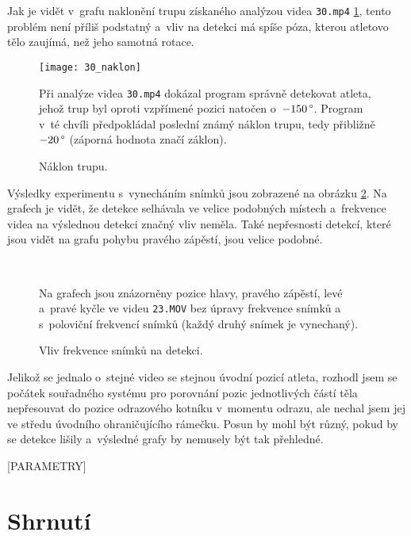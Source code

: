 Jak je vidět v~grafu naklonění trupu získaného analýzou videa \texttt{30.mp4} \ref{fig:30_naklon}, tento problém není příliš podstatný a~vliv na detekci má spíše póza, kterou atletovo tělo zaujímá, než jeho samotná rotace.

\begin{figure}[h]\centering
    \texttt{[image: 30\_naklon]}
    \caption{Náklon trupu.}
    \small
    Při analýze videa \texttt{30.mp4} dokázal program správně detekovat atleta, jehož trup byl oproti vzpřímené pozici natočen o~$-150\,\rm \degree$. Program v~té chvíli předpokládal poslední známý náklon trupu, tedy přibližně $-20\,\rm \degree$ (záporná hodnota značí záklon).
    \label{fig:30_naklon}
\end{figure}

Výsledky experimentu s~vynecháním snímků jsou zobrazené na obrázku \ref{fig:fps}. Na grafech je vidět, že detekce selhávala ve velice podobných místech a~frekvence videa na výslednou detekci značný vliv neměla. Také nepřesnosti detekcí, které jsou vidět na grafu pohybu pravého zápěstí, jsou velice podobné.

\begin{figure}[h]\centering
     \\
    \caption{Vliv frekvence snímků na detekci.}
    \small
    Na grafech jsou znázorněny pozice hlavy, pravého zápěstí, levé a~pravé kyčle ve videu \texttt{23.MOV} bez úpravy frekvence snímků a s~poloviční frekvencí snímků (každý druhý snímek je vynechaný).
    \label{fig:fps}
\end{figure}

Jelikož se jednalo o~stejné video se stejnou úvodní pozicí atleta, rozhodl jsem se počátek souřadného systému pro porovnání pozic jednotlivých částí těla nepřesouvat do pozice odrazového kotníku v~momentu odrazu, ale nechal jsem jej ve středu úvodního ohraničujícího rámečku. Posun by mohl být různý, pokud by se detekce lišily a~výsledné grafy by nemusely být tak přehledné.

[PARAMETRY]




\section{Shrnutí}
\label{sec:shrnuti}


